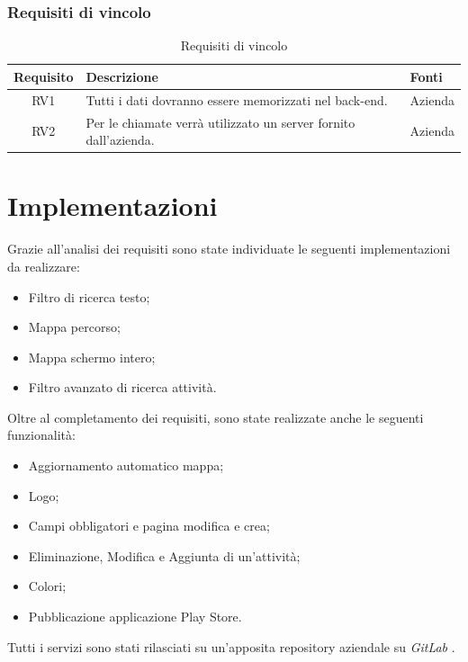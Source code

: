 \subsubsection{Requisiti di vincolo}

\begin{center}
	\begin{table}[h!]
		
		\label{tab:Requisiti di vincolo}
		\begin{tabularx}{\textwidth}{|c|p{8cm}|p{2.1cm}|}
			
			\hline
			\textbf{Requisito} & \centering\textbf{Descrizione} & \textbf{Fonti}  \\\hline
			
				RV1 & Tutti i dati dovranno essere memorizzati nel back-end.  & Azienda\\
				\hline
				RV2 & Per le chiamate verrà utilizzato un server fornito dall'azienda.  & Azienda\\
			\hline		
		\end{tabularx}
		\vspace{0.3cm}
		\caption{Requisiti di vincolo}
	\end{table}
\end{center}


\newpage

\section{Implementazioni}
Grazie all'analisi dei requisiti sono state individuate le seguenti implementazioni da realizzare:
\begin{itemize}
	\item Filtro di ricerca testo;
	\item Mappa percorso;
	\item Mappa schermo intero;
	\item Filtro avanzato di ricerca attività.
\end{itemize}
Oltre al completamento dei requisiti, sono state realizzate anche le seguenti funzionalità: 
\begin{itemize}
	\item Aggiornamento automatico mappa;
	\item Logo;
	\item Campi obbligatori e pagina modifica e crea;
	\item Eliminazione, Modifica e Aggiunta di un'attività;
	\item Colori;
	\item Pubblicazione applicazione Play Store.
\end{itemize}
Tutti i servizi sono stati rilasciati su un'apposita repository aziendale su \textit{GitLab} \cite{repo}.

